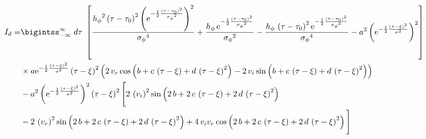 \begin{landscape}
\begin{align}
I_d  =& \bigintss_{-\infty}^{\infty} \; d\tau\; \left[ \frac{{{ h_{\phi}}}^{2} \left( \tau-{ \tau_0} \right) ^{2} \left( {
{\rm e}^{-\frac{1}{2}{\frac { \left( \tau-{ \tau_0} \right) ^{2}}{{{ 
\sigma_{\phi}}}^{2}}}}} \right) ^{2}}{{{ \sigma_{\phi}}}^{4}}+\frac{{ h_{\phi}}
\,{{\rm e}^{-\frac{1}{2}{\frac { \left( \tau-{ \tau_0} \right) ^{2}}{{{ 
\sigma_{\phi}}}^{2}}}}}}{{{ \sigma_{\phi}}}^{2}}-\frac{{ h_{\phi}}\, \left( \tau-{
 \tau_0} \right) ^{2}{{\rm e}^{-\frac{1}{2}{\frac { \left( \tau-{ \tau_0}
 \right) ^{2}}{{{ \sigma_{\phi}}}^{2}}}}}}{{{ \sigma_{\phi}}}^{4}}-{a}^{
2} \left( {{\rm e}^{-\frac{1}{2}{\frac { \left( \tau-\xi \right) ^{2}}{{
\sigma}^{2}}}}} \right) ^{2} \right] \nonumber \\
& \times  a{{\rm e}^{-\frac{1}{2}{\frac { \left( 
\tau-\xi \right) ^{2}}{{\sigma}^{2}}}}} \left( \tau-\xi \right) ^{
2} \left( 2\,v_r \cos \left( b+c\,
 \left( \tau-\xi \right) +d\, \left( \tau-\xi \right) ^{2}
 \right) -2\,v_i \sin \left( b+c\,
 \left( \tau-\xi \right) +d\, \left( \tau-\xi \right) ^{2}
 \right)  \right) \nonumber \\
 &-{a}^{2} \left( {{\rm e}^{-\frac{1}{2}{\frac { \left( \tau-{
 \xi} \right) ^{2}}{{\sigma}^{2}}}}} \right) ^{2} \left( \tau-\xi
 \right) ^{2} \Bigg[ 2\, \left( v_i 
 \right) ^{2}\sin \left( 2\,b+2\,c\, \left( \tau-\xi \right) +2\,d\,
 \left( \tau-\xi \right) ^{2} \right) \nonumber \\
 &-2\, \left( v_r \right) ^{2}\sin \left( 2\,b+2\,c\, \left( \tau-{ \xi
} \right) +2\,d\, \left( \tau-\xi \right) ^{2} \right) +4\,v_i v_r \cos
 \left( 2\,b+2\,c\, \left( \tau-\xi \right) +2\,d\, \left( \tau-{ \xi
} \right) ^{2} \right)  \Bigg] 
\end{align}


\end{landscape}
